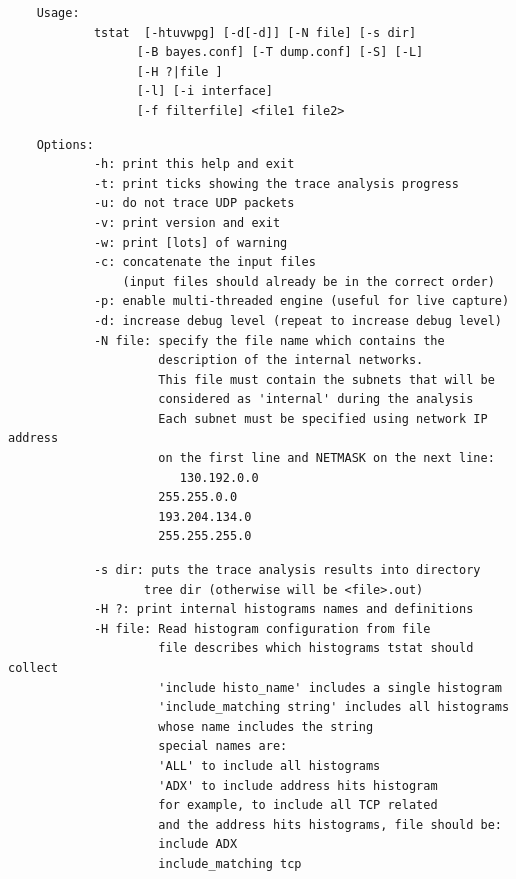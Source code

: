 \documentclass[11pt]{article}
\begin{document}
\begin{small}\begin{verbatim}
    Usage:
            tstat  [-htuvwpg] [-d[-d]] [-N file] [-s dir]
                  [-B bayes.conf] [-T dump.conf] [-S] [-L]
                  [-H ?|file ]
                  [-l] [-i interface]
                  [-f filterfile] <file1 file2>
\end{verbatim}\end{small} \noindent
\begin{small}\begin{verbatim}
    Options:
            -h: print this help and exit
            -t: print ticks showing the trace analysis progress
            -u: do not trace UDP packets
            -v: print version and exit
            -w: print [lots] of warning
            -c: concatenate the input files
                (input files should already be in the correct order)
            -p: enable multi-threaded engine (useful for live capture)
            -d: increase debug level (repeat to increase debug level)
            -N file: specify the file name which contains the
                     description of the internal networks.
                     This file must contain the subnets that will be
                     considered as 'internal' during the analysis
                     Each subnet must be specified using network IP address
                     on the first line and NETMASK on the next line:
                        130.192.0.0
                     255.255.0.0
                     193.204.134.0
                     255.255.255.0
\end{verbatim}\end{small} \noindent
\begin{small}\begin{verbatim}
            -s dir: puts the trace analysis results into directory
                   tree dir (otherwise will be <file>.out)
            -H ?: print internal histograms names and definitions
            -H file: Read histogram configuration from file
                     file describes which histograms tstat should collect
                     'include histo_name' includes a single histogram
                     'include_matching string' includes all histograms
                     whose name includes the string
                     special names are:
                     'ALL' to include all histograms
                     'ADX' to include address hits histogram
                     for example, to include all TCP related
                     and the address hits histograms, file should be:
                     include ADX
                     include_matching tcp
\end{verbatim}\end{small} \noindent
\end{document}
